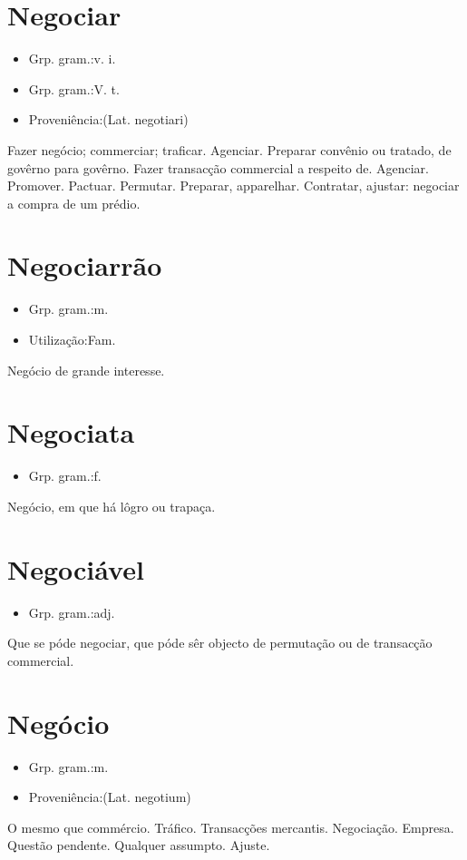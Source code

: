 \section{Negociar}
\begin{itemize}
\item {Grp. gram.:v. i.}
\end{itemize}
\begin{itemize}
\item {Grp. gram.:V. t.}
\end{itemize}
\begin{itemize}
\item {Proveniência:(Lat. \textunderscore negotiari\textunderscore )}
\end{itemize}
Fazer negócio; commerciar; traficar.
Agenciar.
Preparar convênio ou tratado, de govêrno para govêrno.
Fazer transacção commercial a respeito de.
Agenciar.
Promover.
Pactuar.
Permutar.
Preparar, apparelhar.
Contratar, ajustar: \textunderscore negociar a compra de um prédio\textunderscore .
\section{Negociarrão}
\begin{itemize}
\item {Grp. gram.:m.}
\end{itemize}
\begin{itemize}
\item {Utilização:Fam.}
\end{itemize}
Negócio de grande interesse.
\section{Negociata}
\begin{itemize}
\item {Grp. gram.:f.}
\end{itemize}
Negócio, em que há lôgro ou trapaça.
\section{Negociável}
\begin{itemize}
\item {Grp. gram.:adj.}
\end{itemize}
Que se póde negociar, que póde sêr objecto de permutação ou de transacção commercial.
\section{Negócio}
\begin{itemize}
\item {Grp. gram.:m.}
\end{itemize}
\begin{itemize}
\item {Proveniência:(Lat. \textunderscore negotium\textunderscore )}
\end{itemize}
O mesmo que commércio.
Tráfico.
Transacções mercantis.
Negociação.
Empresa.
Questão pendente.
Qualquer assumpto.
Ajuste.
